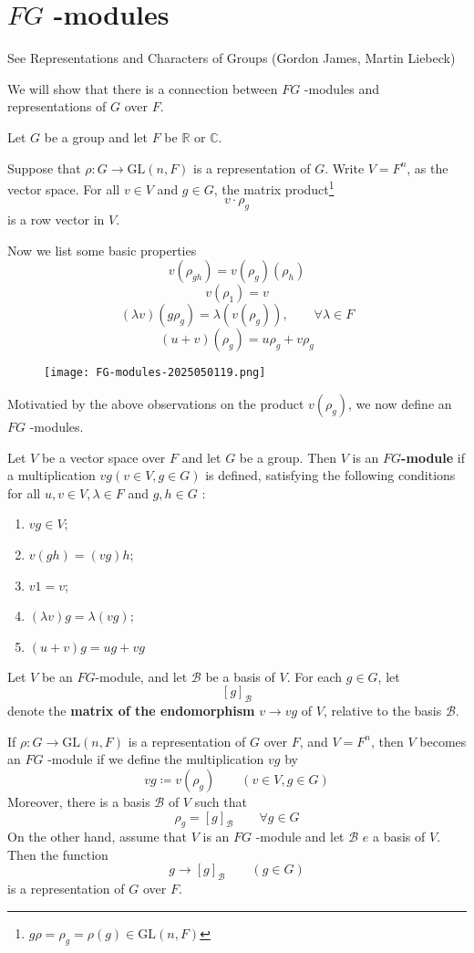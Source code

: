 \section{\texorpdfstring{$FG$}{FG} -modules}

\begin{note}
See Representations and Characters of Groups (Gordon James, Martin Liebeck)
\end{note}
We will show that there is a connection between $FG$ -modules and representations of $G$ over $F$.

Let $G$ be a group and let $F$ be $\mathbb{R}$ or $\mathbb{C}$.

Suppose that $\rho:G\to \mathrm{GL}(n,F)$ is a representation of $G$. Write $V=F^{n}$, as the vector space. For all $v\in V$ and $g\in G$, the matrix product\footnote{$g\rho=\rho_{g}=\rho (g)\in \mathrm{GL}(n,F)$}
\[
v\cdot\rho _{g}
\]
is a row vector in $V$.

Now we list some basic properties
\[
v(\rho_{gh})=v(\rho_{g})(\rho_{h})
\]
\[
v(\rho_{1})=v
\]
\[
(\lambda v)(g\rho_{g})=\lambda(v(\rho_{g})),\qquad \forall \lambda\in F
\]
\[
(u+v)(\rho_{g})=u\rho_{g}+v\rho_{g}
\]
\begin{figure}[H]
\centering
\texttt{[image: FG-modules-2025050119.png]}
\label{}
\end{figure}
Motivatied by the above observations on the product $v(\rho_{g})$, we now define an $FG$ -modules.

\begin{definition}[$FG$-module]
Let $V$ be a vector space over $F$ and let $G$ be a group. Then $V$ is an \textbf{$FG$-module} if a multiplication $v g(v \in V, g \in G)$ is defined, satisfying the following conditions for all $u, v \in V, \lambda \in F$ and $g, h \in G$ :
	\begin{enumerate}
		\item $v g \in V$;
		\item $v(g h)=(v g) h$;
		\item $v 1=v$;
		\item $(\lambda v) g=\lambda(v g)$;
		\item $(u+v) g=u g+v g$\label{4f2b8a}
	\end{enumerate}
\end{definition}
\begin{definition}
Let $V$ be an $FG$-module, and let $\mathscr{B}$ be a basis of $V$. For each $g \in G$, let
\[
[g]_{\mathscr{B}}
\]denote the \textbf{matrix of the endomorphism} $v \rightarrow v g$ of $V$, relative to the basis $\mathscr{B}$.
\end{definition}
If $\rho :G\to \mathrm{GL}(n,F)$ is a representation of $G$ over $F$, and $V=F^{n}$, then $V$ becomes an $FG$ -module if we define the multiplication $vg$ by
\[
vg\coloneqq v(\rho_{g})\qquad (v\in V,g\in G)
\]
Moreover, there is a basis $\mathscr{B}$ of $V$ such that
\[
\rho_{g}=[g]_{\mathscr{B}}\qquad \forall g\in G
\]
On the other hand, assume that $V$ is an $FG$ -module and let $\mathscr{B}$ $e$ a basis of $V$. Then the function
\[
g\to[g]_{\mathscr{B}}\qquad (g\in G)
\]
is a representation of $G$ over $F$.

